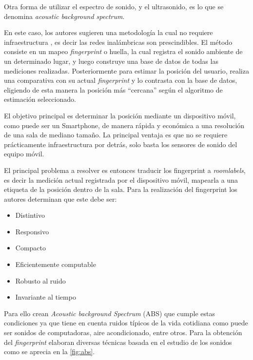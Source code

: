 Otra forma de utilizar el espectro de sonido, y el ultrasonido, es lo que se denomina \textit{acoustic background spectrum}.

En este caso, los autores sugieren una metodología la cual no requiere infraestructura \cite{Tarzia:2011:ILW:1999995.2000011}, es decir las redes inalámbricas son prescindibles. El método consiste en un mapeo \textit{fingerprint} o huella, la cual registra el sonido ambiente de un determinado lugar, y luego construye una base de datos de todas las mediciones realizadas. Posteriormente para estimar la posición del usuario, realiza una comparativa con su actual \textit{fingerprint} y lo contrasta con la base de datos, eligiendo de esta manera la posición más “cercana” según el algoritmo de estimación seleccionado.

El objetivo principal es determinar la posición mediante un dispositivo móvil, como puede ser un Smartphone, de manera rápida y económica a una resolución de una sala de mediano tamaño. La principal ventaja es que no se requiere prácticamente infraestructura por detrás, solo basta los sensores de sonido del equipo móvil.

El principal problema a resolver es entonces traducir los fingerprint a \textit{roomlabels}, es decir la medición actual registrada por el dispositivo móvil, mapearla a una etiqueta de la posición dentro de la sala. Para la realización del fingerprint los autores determinan que este debe ser:

\begin{itemize}
\item Distintivo
\item Responsivo
\item Compacto
\item Eficientemente computable
\item Robusto al ruido
\item Invariante al tiempo
\end{itemize}

Para ello crean \textit{Acoustic background Spectrum} (ABS) que cumple estas condiciones ya que tiene en cuenta ruidos típicos de la vida cotidiana como puede ser sonidos de computadoras, aire acondicionado, entre otros. Para la obtención del \textit{fingerprint} elaboran diversas técnicas basada en el estudio de los sonidos como se aprecia en la  \autoref{fig:abs}.

